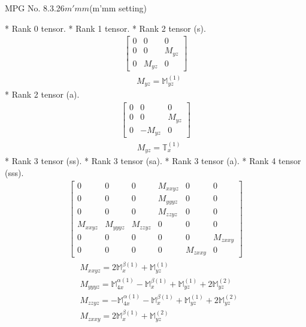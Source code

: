 \documentclass[fleqn,8pt,landscape]{jsarticle}
\begin{document}
\setcounter{MaxMatrixCols}{32}

\renewcommand{\tablename}{Table~}
\renewcommand{\figurename}{Figure~}
\begin{center}
\LARGE
MPG No. 8.3.26\quad$m'mm$\quad(m'mm setting)
\end{center}
* Rank 0 tensor.
* Rank 1 tensor.
* Rank 2 tensor (s).
\begin{align*}
\begin{bmatrix} 0 & 0 & 0 \\ 0 & 0 & M_{yz} \\ 0 & M_{yz} & 0 \end{bmatrix}
\end{align*}
\begin{align*}
& M_{yz} = \mathbb{M}_{yz}^{(1)}
\end{align*}
* Rank 2 tensor (a).
\begin{align*}
\begin{bmatrix} 0 & 0 & 0 \\ 0 & 0 & M_{yz} \\ 0 & - M_{yz} & 0 \end{bmatrix}
\end{align*}
\begin{align*}
& M_{yz} = \mathbb{T}_{x}^{(1)}
\end{align*}
* Rank 3 tensor (ss).
* Rank 3 tensor (sa).
* Rank 3 tensor (a).
* Rank 4 tensor (sss).
\begin{align*}
\begin{bmatrix} 0 & 0 & 0 & M_{xxyz} & 0 & 0 \\ 0 & 0 & 0 & M_{yyyz} & 0 & 0 \\ 0 & 0 & 0 & M_{zzyz} & 0 & 0 \\ M_{xxyz} & M_{yyyz} & M_{zzyz} & 0 & 0 & 0 \\ 0 & 0 & 0 & 0 & 0 & M_{zxxy} \\ 0 & 0 & 0 & 0 & M_{zxxy} & 0 \end{bmatrix}
\end{align*}
\begin{align*}
& M_{xxyz} = 2 \mathbb{M}_{x}^{\beta(1)} + \mathbb{M}_{yz}^{(1)} \\
& M_{yyyz} = \mathbb{M}_{4x}^{\alpha(1)} - \mathbb{M}_{x}^{\beta(1)} + \mathbb{M}_{yz}^{(1)} + 2 \mathbb{M}_{yz}^{(2)} \\
& M_{zzyz} = - \mathbb{M}_{4x}^{\alpha(1)} - \mathbb{M}_{x}^{\beta(1)} + \mathbb{M}_{yz}^{(1)} + 2 \mathbb{M}_{yz}^{(2)} \\
& M_{zxxy} = 2 \mathbb{M}_{x}^{\beta(1)} + \mathbb{M}_{yz}^{(2)}
\end{align*}
\end{document}
